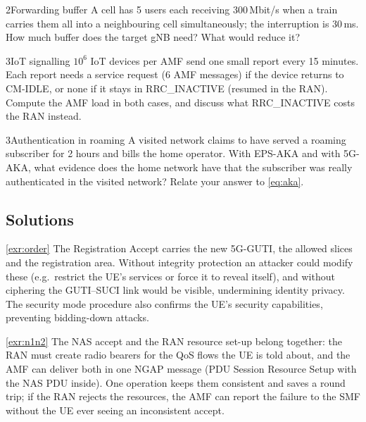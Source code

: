 \documentclass[11pt,a4paper]{article}
\begin{document}
\begin{exercisebox}{2}{Forwarding buffer}\label{exr:fwd}
A cell has 5 users each receiving 300\,Mbit/s when a train carries them all into a neighbouring cell simultaneously; the interruption is 30\,ms.
How much buffer does the target gNB need? What would reduce it?
\end{exercisebox}

\begin{exercisebox}{3}{IoT signalling}\label{exr:iot}
$10^6$ IoT devices per AMF send one small report every 15 minutes. Each report needs a service request (6 AMF messages) if the device returns to
CM-IDLE, or none if it stays in RRC\_INACTIVE (resumed in the RAN). Compute the AMF load in both cases, and discuss what RRC\_INACTIVE costs the
RAN instead.
\end{exercisebox}

\begin{exercisebox}{3}{Authentication in roaming}\label{exr:roam}
A visited network claims to have served a roaming subscriber for 2 hours and bills the home operator. With EPS-AKA and with 5G-AKA, what evidence
does the home network have that the subscriber was really authenticated in the visited network? Relate your answer to \cref{eq:aka}.
\end{exercisebox}

\subsection*{Solutions}

\begin{solutionbox}{\ref{exr:order}}
The Registration Accept carries the new 5G-GUTI, the allowed slices and the registration area. Without integrity protection an attacker could
modify these (e.g.\ restrict the UE's services or force it to reveal itself), and without ciphering the GUTI--SUCI link would be visible,
undermining identity privacy. The security mode procedure also confirms the UE's security capabilities, preventing bidding-down attacks.
\end{solutionbox}

\begin{solutionbox}{\ref{exr:n1n2}}
The NAS accept and the RAN resource set-up belong together: the RAN must create radio bearers for the QoS flows the UE is told about, and the AMF
can deliver both in one NGAP message (PDU Session Resource Setup with the NAS PDU inside). One operation keeps them consistent and saves a round
trip; if the RAN rejects the resources, the AMF can report the failure to the SMF without the UE ever seeing an inconsistent accept.
\end{solutionbox}
\end{document}
